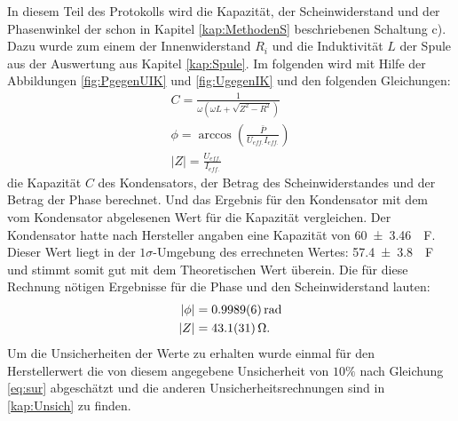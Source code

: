 In diesem Teil des Protokolls wird die Kapazität, der Scheinwiderstand und der Phasenwinkel der schon in Kapitel \ref{kap:MethodenS} beschriebenen Schaltung c). 
Dazu wurde zum einem der Innenwiderstand $R_i$ und die Induktivität $L$ der Spule aus der Auswertung aus Kapitel \ref{kap:Spule}.
Im folgenden wird mit Hilfe der Abbildungen \ref{fig:PgegenUIK} und \ref{fig:UgegenIK}
und den folgenden Gleichungen:
\begin{align}
C=\frac{1}{\omega (\omega L+\sqrt{Z^2-R^2})}\\	
\phi = \arccos\left(\frac{\bar{P}}{U_{eff.}I_{eff.}}\right)\\
	|Z|=\frac{U_{eff.}}{I_{eff.}}
\end{align}
die Kapazität $C$ des Kondensators, der Betrag des Scheinwiderstandes und der Betrag der Phase berechnet. Und das Ergebnis für den Kondensator mit dem vom Kondensator abgelesenen Wert für die Kapazität vergleichen.
Der Kondensator hatte nach Hersteller angaben eine Kapazität von \SI{60+-3.46}{\mu F}.
Dieser Wert liegt in der $1\sigma$-Umgebung des errechneten Wertes: \SI{57.4+-3.8}{\mu F} und stimmt somit gut mit dem Theoretischen Wert überein.
Die für diese Rechnung nötigen Ergebnisse für die Phase und den Scheinwiderstand lauten:
\begin{align}
	|\phi| &=\SI{0.9989+-0.0006}{rad}\\
	|Z| &=\SI{43.1+-3.1}{\ohm}.
\end{align}
Um die Unsicherheiten der Werte zu erhalten wurde einmal für den Herstellerwert die von diesem angegebene Unsicherheit von $10\%$ nach Gleichung
\ref{eq:sur} abgeschätzt und die anderen Unsicherheitsrechnungen sind in \ref{kap:Unsich} zu finden.
